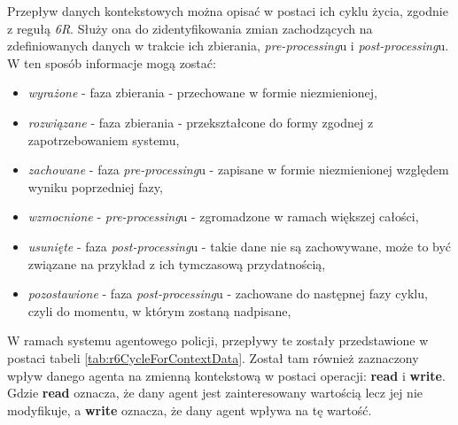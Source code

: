 \par Przepływ danych kontekstowych można opisać w postaci ich cyklu życia, zgodnie z regułą \emph{6R}\cite{Klimek2023}. Służy ona do zidentyfikowania zmian zachodzących na zdefiniowanych danych w trakcie ich zbierania, \emph{pre-processing}u i \emph{post-processing}u. W ten sposób informacje mogą zostać:
\begin{itemize}
    \item \emph{wyrażone} - faza zbierania - przechowane w formie niezmienionej,
    \item \emph{rozwiązane} - faza zbierania - przekształcone do formy zgodnej z zapotrzebowaniem systemu,
    \item \emph{zachowane} - faza \emph{pre-processing}u - zapisane w formie niezmienionej względem wyniku poprzedniej fazy,
    \item \emph{wzmocnione} - \emph{pre-processing}u - zgromadzone w ramach większej całości,
    \item \emph{usunięte} - faza \emph{post-processing}u - takie dane nie są zachowywane, może to być związane na przykład z ich tymczasową przydatnością,
    \item \emph{pozostawione} - faza \emph{post-processing}u - zachowane do następnej fazy cyklu, czyli do momentu, w którym zostaną nadpisane,
\end{itemize}
W ramach systemu agentowego policji, przepływy te zostały przedstawione w postaci tabeli \ref{tab:r6CycleForContextData}. Został tam również zaznaczony wpływ danego agenta na zmienną kontekstową w postaci operacji: \textbf{read} i \textbf{write}. Gdzie \textbf{read} oznacza, że dany agent jest zainteresowany wartością lecz jej nie modyfikuje, a \textbf{write} oznacza, że dany agent wpływa na tę wartość.

